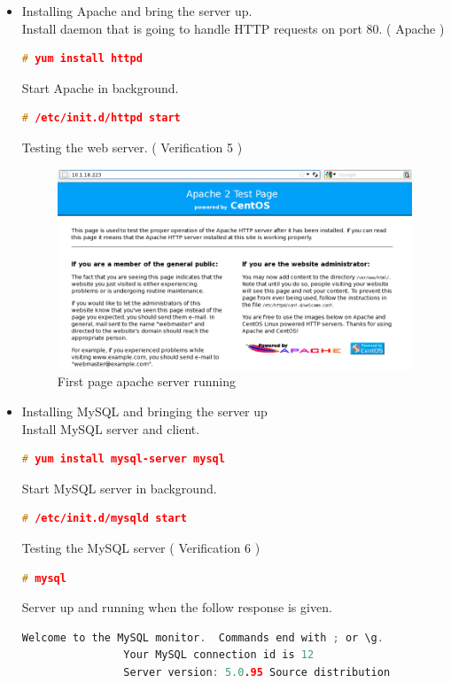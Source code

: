 \begin{itemize}
		\item Installing Apache and bring the server up.\\
			Install daemon that is going to handle HTTP requests on port 80. ( Apache )
			\begin{lstlisting}[language=c, stepnumber=0, tabsize=1]
				# yum install httpd
			\end{lstlisting}
			Start Apache in background.
			\begin{lstlisting}[language=c, stepnumber=0, tabsize=1]
				# /etc/init.d/httpd start
			\end{lstlisting}			
			Testing the web server. ( Verification 5 )
			\begin{figure}[H]
				\begin{centering}
					\includegraphics[width=1.0\textwidth]{content/appendix/eudp/images/first_web.png}
					\caption{First page apache server running}
				\end{centering}
			\end{figure}
		\item Installing MySQL and bringing the server up\\
			Install MySQL server and client.
			\begin{lstlisting}[language=c, stepnumber=0, tabsize=1]
				# yum install mysql-server mysql
			\end{lstlisting}
			Start MySQL server in background.
			\begin{lstlisting}[language=c, stepnumber=0, tabsize=1]
				# /etc/init.d/mysqld start
			\end{lstlisting}
			Testing the MySQL server ( Verification 6 )
			\begin{lstlisting}[language=c, stepnumber=0, tabsize=1]
				# mysql
			\end{lstlisting}
			Server up and running when the follow response is given.
			\begin{lstlisting}[language=c, stepnumber=0, tabsize=1]
				Welcome to the MySQL monitor.  Commands end with ; or \g.
				Your MySQL connection id is 12
				Server version: 5.0.95 Source distribution


\end{lstlisting}
\end{itemize}
